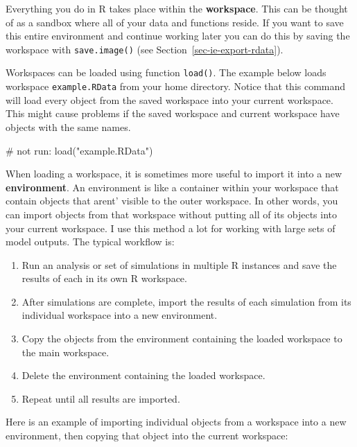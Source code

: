 \documentclass[
  13,
  letterpaper,
]{report}
\newenvironment{Shaded}{\begin{snugshade}}{\end{snugshade}}
\newcommand{\CommentTok}[1]{\textcolor[rgb]{0.37,0.37,0.37}{#1}}
\newcommand{\FunctionTok}[1]{\textcolor[rgb]{0.28,0.35,0.67}{#1}}
\newcommand{\NormalTok}[1]{\textcolor[rgb]{0.00,0.23,0.31}{#1}}
\newcommand{\StringTok}[1]{\textcolor[rgb]{0.13,0.47,0.30}{#1}}
\providecommand{\tightlist}{%
  \setlength{\itemsep}{0pt}\setlength{\parskip}{0pt}}
\begin{document}
Everything you do in R takes place within the \textbf{workspace}. This
can be thought of as a sandbox where all of your data and functions
reside. If you want to save this entire environment and continue working
later you can do this by saving the workspace with \texttt{save.image()}
(see Section~\ref{sec-ie-export-rdata}).

Workspaces can be loaded using function \texttt{load()}. The example
below loads workspace \texttt{example.RData} from your home directory.
Notice that this command will load every object from the saved workspace
into your current workspace. This might cause problems if the saved
workspace and current workspace have objects with the same names.

\begin{Shaded}
\begin{Highlighting}[]
\CommentTok{\# not run:}
\FunctionTok{load}\NormalTok{(}\StringTok{"example.RData"}\NormalTok{)}
\end{Highlighting}
\end{Shaded}

When loading a workspace, it is sometimes more useful to import it into
a new \textbf{environment}. An environment is like a container within
your workspace that contain objects that arent' visible to the outer
workspace. In other words, you can import objects from that workspace
without putting all of its objects into your current workspace. I use
this method a lot for working with large sets of model outputs. The
typical workflow is:

\begin{enumerate}
\def\labelenumi{\arabic{enumi}.}
\tightlist
\item
  Run an analysis or set of simulations in multiple R instances and save
  the results of each in its own R workspace.
\item
  After simulations are complete, import the results of each simulation
  from its individual workspace into a new environment.
\item
  Copy the objects from the environment containing the loaded workspace
  to the main workspace.
\item
  Delete the environment containing the loaded workspace.
\item
  Repeat until all results are imported.
\end{enumerate}

Here is an example of importing individual objects from a workspace into
a new environment, then copying that object into the current workspace:
\end{document}
